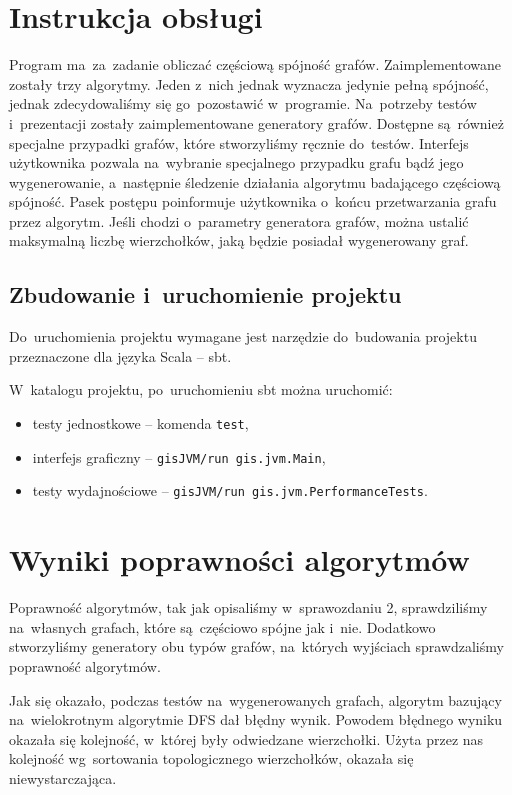 \documentclass[a4paper,12pt]{mwart}
\begin{document}
\section{Instrukcja obsługi}

Program ma~za~zadanie obliczać częściową spójność grafów. Zaimplementowane
zostały trzy algorytmy. Jeden z~nich jednak wyznacza jedynie pełną spójność,
jednak zdecydowaliśmy się go~pozostawić w~programie. Na~potrzeby testów
i~prezentacji zostały zaimplementowane generatory grafów. Dostępne są~również
specjalne przypadki grafów, które stworzyliśmy ręcznie do~testów. Interfejs
użytkownika pozwala na~wybranie specjalnego przypadku grafu bądź jego
wygenerowanie, a~następnie śledzenie działania algorytmu badającego częściową
spójność. Pasek postępu poinformuje użytkownika o~końcu przetwarzania grafu
przez algorytm. Jeśli chodzi o~parametry generatora grafów, można ustalić
maksymalną liczbę wierzchołków, jaką będzie posiadał wygenerowany graf.

\subsection{Zbudowanie i~uruchomienie projektu}

Do~uruchomienia projektu wymagane jest narzędzie do~budowania projektu
przeznaczone dla języka Scala -- sbt.

W~katalogu projektu, po~uruchomieniu sbt można uruchomić:
\begin{itemize}
\item testy jednostkowe -- komenda \verb+test+,
\item interfejs graficzny -- \verb+gisJVM/run gis.jvm.Main+,
\item testy wydajnościowe -- \verb+gisJVM/run gis.jvm.PerformanceTests+.
\end{itemize}

\section{Wyniki poprawności algorytmów}

Poprawność algorytmów, tak jak opisaliśmy w~sprawozdaniu 2, sprawdziliśmy
na~własnych grafach, które są~częściowo spójne jak i~nie. Dodatkowo
stworzyliśmy generatory obu typów grafów, na~których wyjściach sprawdzaliśmy
poprawność algorytmów.

Jak się okazało, podczas testów na~wygenerowanych grafach, algorytm bazujący
na~wielokrotnym algorytmie DFS dał błędny wynik. Powodem błędnego wyniku
okazała się kolejność, w~której były odwiedzane wierzchołki. Użyta przez nas
kolejność wg~sortowania topologicznego wierzchołków, okazała się
niewystarczająca.
\end{document}
